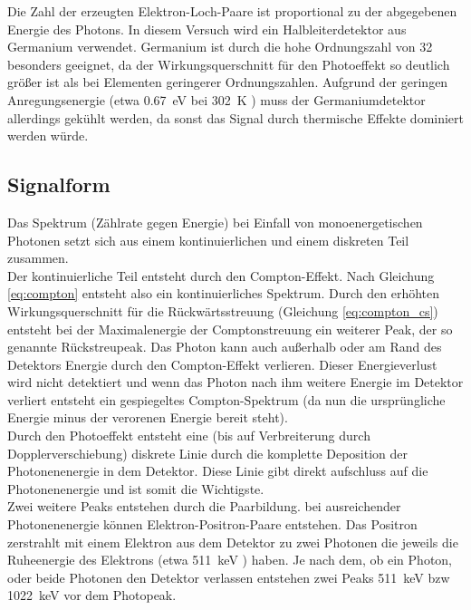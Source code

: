 Die Zahl der erzeugten Elektron-Loch-Paare ist proportional zu der abgegebenen Energie des Photons. In diesem Versuch wird ein Halbleiterdetektor aus Germanium verwendet. Germanium ist durch die hohe Ordnungszahl von 32 besonders geeignet, da der Wirkungsquerschnitt für den Photoeffekt so deutlich größer ist als bei Elementen geringerer Ordnungszahlen. Aufgrund der geringen Anregungsenergie (etwa \SI{0.67}{\electronvolt} bei \SI{302}{\kelvin} \cite{bandgap}) muss der Germaniumdetektor allerdings gekühlt werden, da sonst das Signal durch thermische Effekte dominiert werden würde.

\subsection{Signalform}
Das Spektrum (Zählrate gegen Energie) bei Einfall von monoenergetischen Photonen setzt sich aus einem kontinuierlichen und einem diskreten Teil zusammen.\\

 Der kontinuierliche Teil entsteht durch den Compton-Effekt. Nach Gleichung \ref{eq:compton} entsteht also ein kontinuierliches Spektrum. Durch den erhöhten Wirkungsquerschnitt für die Rückwärtsstreuung (Gleichung \ref{eq:compton_cs}) entsteht bei der Maximalenergie der Comptonstreuung ein weiterer Peak, der so genannte Rückstreupeak. Das Photon kann auch außerhalb oder am Rand des Detektors Energie durch den Compton-Effekt verlieren. Dieser Energieverlust wird nicht detektiert und wenn das Photon nach ihm weitere Energie im Detektor verliert entsteht ein gespiegeltes Compton-Spektrum (da nun die ursprüngliche Energie minus der verorenen Energie bereit steht). \\ 

Durch den Photoeffekt entsteht eine (bis auf Verbreiterung durch Dopplerverschiebung) diskrete Linie durch die komplette Deposition der Photonenenergie in dem Detektor. Diese Linie gibt direkt aufschluss auf die Photonenenergie und ist somit die Wichtigste.  \\

Zwei weitere Peaks entstehen durch die Paarbildung. bei ausreichender Photonenenergie können Elektron-Positron-Paare entstehen. Das Positron zerstrahlt mit einem Elektron aus dem Detektor zu zwei Photonen die jeweils die Ruheenergie des Elektrons (etwa \SI{511}{\kilo\electronvolt} \cite{Agashe:2014kda}) haben. Je nach dem, ob ein Photon, oder beide Photonen den Detektor verlassen entstehen zwei Peaks \SI{511}{\kilo\electronvolt} bzw \SI{1022}{\kilo\electronvolt} vor dem Photopeak.\\

